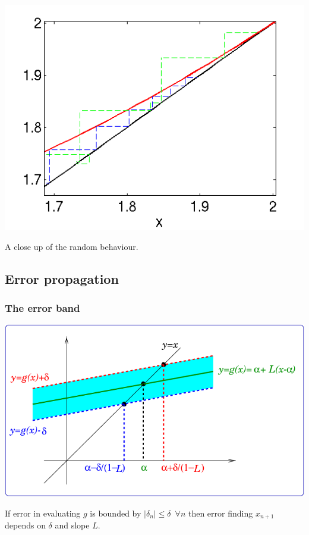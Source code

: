 \documentclass{beamer}
\begin{document}
\begin{frame}
\begin{overlayarea}{\textwidth}{0.9\textheight}
{    }
    {
      \begin{center}
        \includegraphics[height=0.8\textheight]{figures/ErrorExample2d}
      \end{center}
      A close up of the random behaviour.
    }
  \end{overlayarea}

\end{frame}


\subsection{Error propagation}


\begin{frame}
  \frametitle{The error band}

  \begin{center}
    \includegraphics[height=0.7\textheight]{figures/contract_error}
  \end{center}
  If error in evaluating $g$ is bounded by $|\delta_n| \leq \delta
  \,\,\, \forall n$ then error finding $x_{n+1}$ depends on $\delta$
  and slope $L$.

\end{frame}
\end{document}
